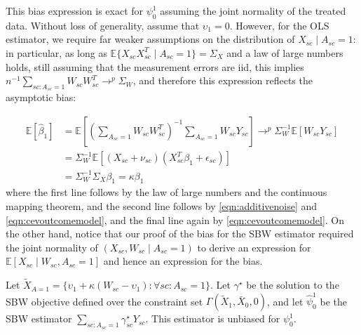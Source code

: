 \begin{remark}  
    This bias expression is exact for $\psi_0^1$ assuming the joint normality of the treated data. Without loss of generality, assume that $\upsilon_1 = 0$. However, for the OLS estimator, we require far weaker assumptions on the distribution of $X_{sc} \mid A_{sc} = 1$: in particular, as long as $\mathbb{E}\{X_{sc}X_{sc}^T \mid A_{sc} = 1\} = \Sigma_X$ and a law of large numbers holds, still assuming that the measurement errors are iid, this implies $n^{-1}\sum_{sc: A_{sc} = 1}W_{sc}W_{sc}^T \to^p \Sigma_W$, and therefore this expression reflects the asymptotic bias: 
    
    \begin{align*}
    \mathbb{E}[\hat{\beta}_1] &= \mathbb{E}[(\sum_{A_{sc} = 1}W_{sc}W_{sc}^T)^{-1}\sum_{A_{sc} = 1}W_{sc}Y_{sc}] \to^p \Sigma_W^{-1}\mathbb{E}[W_{sc}Y_{sc}] \\ 
    &= \Sigma_W^{-1}\mathbb{E}[(X_{sc} + \nu_{sc})(X_{sc}^T\beta_1 + \epsilon_{sc})] \\
    &= \Sigma_W^{-1}\Sigma_X\beta_1 = \kappa \beta_1
    \end{align*}
    where the first line follows by the law of large numbers and the continuous mapping theorem, and the second line follows by \eqref{eqn:additivenoise} and \eqref{eqn:cevoutcomemodel}, and the final line again by \eqref{eqn:cevoutcomemodel}. On the other hand, notice that our proof of the bias for the SBW estimator required the joint normality of $(X_{sc}, W_{sc} \mid A_{sc} = 1)$ to derive an expression for $\mathbb{E}[X_{sc} \mid W_{sc}, A_{sc} = 1]$ and hence an expression for the bias.
\end{remark}

\begin{proposition}\label{cl2}
Let $\tilde{X}_{A=1} = \{\upsilon_1 + \kappa (W_{sc} - \upsilon_1): \forall sc: A_{sc} = 1\}$. Let $\gamma^\star$ be the solution to the SBW objective defined over the constraint set $\Gamma(\tilde{X}_1, \bar{X}_0, 0)$, and let $\hat{\psi}^1_0$ be the SBW estimator $\sum_{sc: A_{sc} = 1}\gamma^\star_{sc}Y_{sc}$. This estimator is unbiased for $\psi_0^1$.
\end{proposition}



